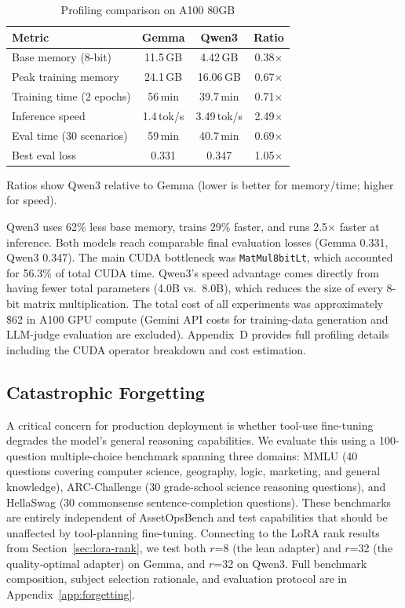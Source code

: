 \documentclass[conference]{IEEEtran}
\begin{document}
\begin{table}[t]
\centering
\caption{Profiling comparison on A100 80GB}
\label{tab:profiling-comparison}
\begin{tabular}{lccc}
\hline
\textbf{Metric} & \textbf{Gemma} & \textbf{Qwen3} & \textbf{Ratio} \\
\hline
Base memory (8-bit) & 11.5\,GB & 4.42\,GB & 0.38$\times$ \\
Peak training memory & 24.1\,GB & 16.06\,GB & 0.67$\times$ \\
Training time (2 epochs) & 56\,min & 39.7\,min & 0.71$\times$ \\
Inference speed & 1.4\,tok/s & 3.49\,tok/s & 2.49$\times$ \\
Eval time (30 scenarios) & 59\,min & 40.7\,min & 0.69$\times$ \\
Best eval loss & 0.331 & 0.347 & 1.05$\times$ \\
\hline
\end{tabular}

\vspace{0.3em}
\begin{minipage}{0.95\columnwidth}
\footnotesize
Ratios show Qwen3 relative to Gemma (lower is better for memory/time; higher for speed).
\end{minipage}
\end{table}

Qwen3 uses 62\% less base memory, trains 29\% faster, and runs 2.5$\times$ faster at inference. Both models reach comparable final evaluation losses (Gemma 0.331, Qwen3 0.347). The main CUDA bottleneck was \texttt{MatMul8bitLt}, which accounted for 56.3\% of total CUDA time. Qwen3's speed advantage comes directly from having fewer total parameters (4.0B vs.\ 8.0B), which reduces the size of every 8-bit matrix multiplication. The total cost of all experiments was approximately \$62 in A100 GPU compute (Gemini API costs for training-data generation and LLM-judge evaluation are excluded). Appendix~D provides full profiling details including the CUDA operator breakdown and cost estimation.


\subsection{Catastrophic Forgetting}
\label{sec:forgetting}

A critical concern for production deployment is whether tool-use fine-tuning degrades the model's general reasoning capabilities. We evaluate this using a 100-question multiple-choice benchmark spanning three domains: MMLU (40 questions covering computer science, geography, logic, marketing, and general knowledge), ARC-Challenge (30 grade-school science reasoning questions), and HellaSwag (30 commonsense sentence-completion questions). These benchmarks are entirely independent of AssetOpsBench and test capabilities that should be unaffected by tool-planning fine-tuning. Connecting to the LoRA rank results from Section~\ref{sec:lora-rank}, we test both $r$=8 (the lean adapter) and $r$=32 (the quality-optimal adapter) on Gemma, and $r$=32 on Qwen3. Full benchmark composition, subject selection rationale, and evaluation protocol are in Appendix~\ref{app:forgetting}.
\end{document}
